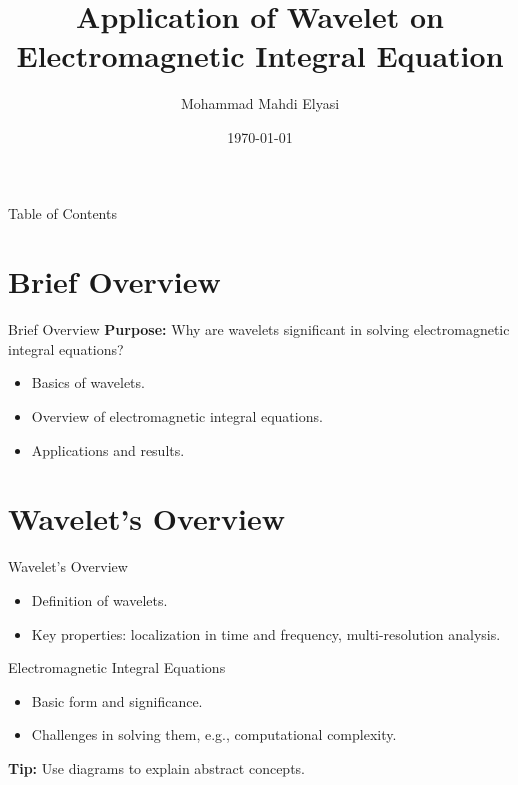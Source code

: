 \documentclass{beamer}
\title[Wavelet on Integral Equation]{Application of Wavelet on Electromagnetic Integral Equation}
\author[Mohammad Mahdi Elyasi]{Mohammad Mahdi Elyasi}
\institute[Amirkabir]{
    Supervisor: Dr. Moradi \\[1cm] %
    Faculty of Electrical Engineering \\ %
}
\date{\today} %
\begin{document}
\begin{frame}
    
    \titlepage
\end{frame}

\begin{frame}{Table of Contents}
    \tableofcontents
\end{frame}

\section{Brief Overview}
\begin{frame}{Brief Overview}
    \textbf{Purpose:} Why are wavelets significant in solving electromagnetic integral equations?
    \begin{itemize}
        \item Basics of wavelets.
        \item Overview of electromagnetic integral equations.
        \item Applications and results.
    \end{itemize}
\end{frame}

\section{Wavelet's Overview}
\begin{frame}{Wavelet's Overview}
    \begin{itemize}
        \item Definition of wavelets.
        \item Key properties: localization in time and frequency, multi-resolution analysis.
    \end{itemize}
\end{frame}

\begin{frame}{Electromagnetic Integral Equations}
    \begin{itemize}
        \item Basic form and significance.
        \item Challenges in solving them, e.g., computational complexity.
    \end{itemize}
    \textbf{Tip:} Use diagrams to explain abstract concepts.
\end{frame}

\end{document}
